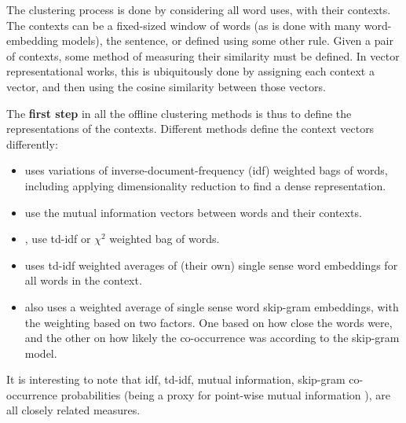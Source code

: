 {

The clustering process is done by considering all word uses, with their contexts.
The contexts can be a fixed-sized window of words (as is done with many word-embedding models), the sentence, or defined using some other rule.
Given a pair of contexts, some method of measuring their similarity must be defined.
In vector representational works, this is ubiquitously done by assigning each context a vector, and then using the cosine similarity between those vectors.

The \textbf{first step} in all the offline clustering methods is thus to define the representations of the contexts.
Different methods define the context vectors differently:
\begin{itemize}
\item \textcite{Schutze:1998wordsenseclustering} uses variations of inverse-document-frequency (idf) weighted bags of words, including applying dimensionality reduction to find a dense representation.
\item \textcite{pantel2002WSI} use the mutual information vectors between words and their contexts.
\item \textcite{Reisinger2010}, use td-idf or $\chi^2$ weighted bag of words.
\item {} uses td-idf weighted averages of (their own) single sense word embeddings for all words in the context.
\item  {} also uses a weighted average of single sense word skip-gram embeddings, with the weighting based on two factors. One based on how close the words were, and the other on how likely the co-occurrence was according to the skip-gram model.

\end{itemize}
It is interesting to note that idf, td-idf, mutual information, skip-gram co-occurrence probabilities (being a proxy for point-wise mutual information \parencite{levy2014neural}), are all closely related measures.

}
